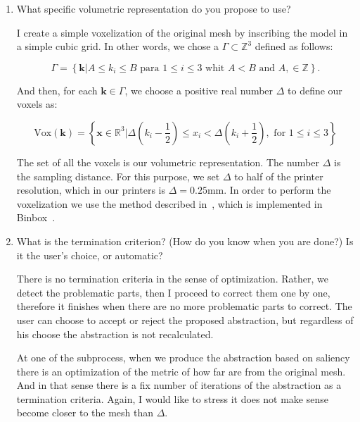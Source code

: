 \begin{enumerate}
	\item What specific volumetric representation do you propose to use?
	
	I create a simple voxelization of the original mesh by inscribing the model in a simple cubic grid. In other words, we chose a $\Gamma \subset \mathbb{Z}^3$ defined as follows: 
	
	\begin{equation}
		\Gamma = \left\lbrace \textbf{k} | A \leq k_i \leq B \text{ para } 1 \leq i \leq 3 \text{ whit } A < B \text{ and } A,  \in \mathbb{Z} 	\right\rbrace 
		\label{eq:scene}.
\end{equation}

	And then, for each $\textbf{k} \in \Gamma$, we choose a positive real number $\Delta$ to define our voxels as:
	
	\begin{equation}
		\text{Vox} (\textbf{k}) = \left\lbrace \textbf{x} \in \mathbb{R}^3 | \Delta \left(  k_i - \dfrac{1}{2} \right) \leq x_i < \Delta \left(  k_i + \dfrac{1}{2} \right)  , \text{ for } 1 \leq i \leq 3 \right\rbrace 
		\label{ec:voxel}
	\end{equation}
	
	The set of all the voxels is our volumetric representation. The number $\Delta$ is the sampling distance. For this purpose, we set $\Delta$ to half of the printer resolution, which in our printers is $\Delta = 0.25$mm. In order to perform the voxelization we use the method described in~\cite{Nooruddin2003}, which is implemented in Binbox~\cite{Min2016}.
	
	\item What is the termination criterion? (How do you know when you are done?) Is it the user's choice, or automatic?
	
	There is no termination criteria in the sense of optimization. Rather, we detect the problematic parts, then I proceed to correct them one by one, therefore it finishes when there are no more problematic parts to correct. The user can choose to accept or reject the proposed abstraction, but regardless of his choose the abstraction is not recalculated.
	
	At one of the subprocess, when we produce the abstraction based on saliency there is an optimization of the metric of how far are from the original mesh. And in that sense there is a fix number of iterations of the abstraction as a termination criteria. Again, I would like to stress it does not make sense become closer to the mesh than $\Delta$.


\end{enumerate}
